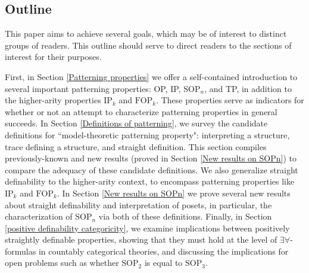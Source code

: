 \documentclass{article}
\newcommand{\SOP}{\text{SOP}}
\theoremstyle{definition}
\theoremstyle{definition}
\theoremstyle{definition}
\begin{document}

\subsection{Outline}

This paper aims to achieve several goals, which may be of interest to distinct groups of readers. This outline should serve to direct readers to the sections of interest for their purposes.

First, in Section \ref{Patterning properties} we offer a self-contained introduction to several important  patterning properties: OP, IP, $\SOP_n$, and TP, in addition to the higher-arity properties $\text{IP}_k$ and $\text{FOP}_k$. These properties serve as indicators for whether or not an attempt to characterize patterning properties in general succeeds. In Section \ref{Definitions of patterning}, we survey the candidate definitions for ``model-theoretic patterning property": interpreting a structure, trace defining a structure,  and straight definition. This section compiles previously-known and new results (proved in Section \ref{New results on SOPn}) to compare the adequacy of these candidate definitions. We also generalize straight definability to the higher-arity context, to encompass patterning properties like $\mathrm{IP}_{k}$ and $\mathrm{FOP}_{k}$. In Section \ref{New results on SOPn} we prove several new results about straight definability and interpretation of posets, in particular, the characterization of $\SOP_n$ via both of these definitions. Finally, in Section \ref{positive definability categoricity}, we examine implications between positively straightly definable properties, showing that they must hold at the level of $\exists\forall$-formulas in countably categorical theories, and discussing the implications for open problems such as whether $\mathrm{SOP}_{2}$ is equal to $\mathrm{SOP}_{3}$. 
\end{document}
